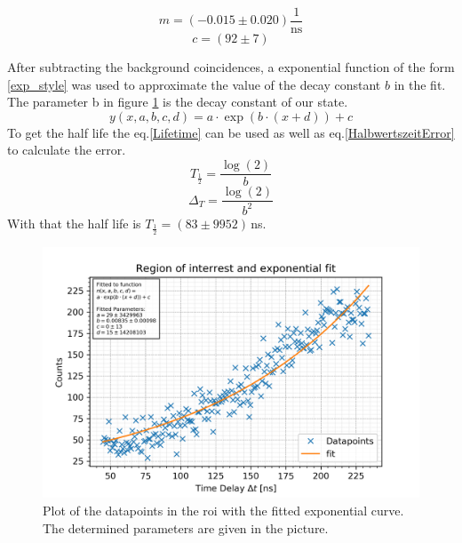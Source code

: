 \documentclass[30pt,a4paper]{article}
\begin{document}
 	\begin{equation*}
 	m = (-0.015 \pm 0.020)\frac{1}{\textrm{ns}}
 	\end{equation*}
 	$$c = (92 \pm 7)$$
 	
 	
 	
 
 	
 	\FloatBarrier
 	After subtracting the background coincidences, a exponential function of the form
 	\ref{exp_style} was used to approximate the value of the decay constant $b$ in the fit. The parameter b in figure \ref{exp_fit} is the decay constant of our state. 
 	\begin{equation}
 	y\left(x,a,b,c,d\right) = a \cdot \exp\left(b\cdot\left(x+d\right)\right) + c
 	\label{exp_style}
 	\end{equation}
 	To get the half life the eq.\ref{Lifetime} can be used as well as eq.\ref{HalbwertszeitError} to calculate the error.
 	\begin{equation}
 	T_\frac{1}{2}=\frac{\log(2)}{b}
 	\label{Lifetime} 
 	\end{equation}
 	\begin{equation}
 	\Delta_T=\frac{\log(2)}{b^2}
 	\label{HalbwertszeitError} 
 	\end{equation}
 	With that the half life is $T_\frac{1}{2}=(83\pm9952)$\,ns.
 	\begin{figure}[h]
 		\includegraphics{Bilder/lin_fit_exp}
 		\centering
 		\caption[Exponential Fit of the Decay]{\small Plot of the datapoints in the roi with the fitted exponential curve. The determined parameters are given in the picture.}
 		\label{exp_fit}
 	\end{figure}
\end{document}
